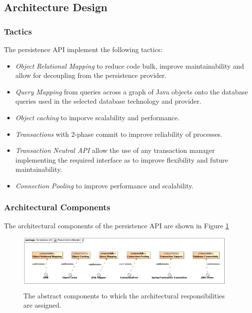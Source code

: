 \subsection{Architecture Design}
\subsubsection{Tactics}
The persistence API implement the following tactics:
\begin{itemize}
	\item \textit{Object Relational Mapping} to reduce code bulk, improve
		maintainability and allow for decoupling from the persistence 
		provider.
	\item \textit{Query Mapping} from queries across a graph of Java objects
		onto the database queries used in the selected database 
		technology and provider.
	\item \textit{Object caching} to imporve scalability and performance.
	\item \textit{Transactions} with 2-phase commit to improve reliability
		of processes.
	\item \textit{Transaction Neutral API} allow the use of any transaction manager
		implementing the required interface as to improve flexibility and
		future maintainability.
	\item \textit{Connection Pooling} to improve performance and scalability.
\end{itemize}

\subsubsection{Architectural Components}
The architectural components of the persistence API are shown in Figure \ref{fig:persistenceResponsibilityAllocation}
\begin{figure}[H]
	\begin{center}
	\includegraphics[scale=0.5]{../Diagrams and Charts/Persistence API/ResponsibilityAllocation.jpg}
	\caption{The abstract components to which the architectural responsibilities are assigned.}
	\label{fig:persistenceResponsibilityAllocation}
	\end{center}
\end{figure}

